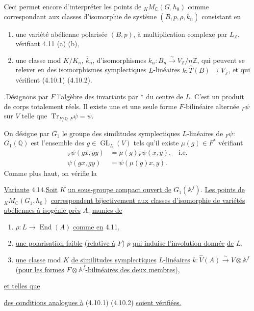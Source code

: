 \documentclass[10pt]{article}
\newcommand{\Af}{\mathbb A^f}
\newcommand{\C}{\mathbb C}
\newcommand{\Q}{\mathbb Q}
\newcommand{\Z}{\mathbb Z}
\newcommand{\GL}{\operatorname{GL}}
\newcommand{\End}{\operatorname{End}}
\newcommand{\Tr}{\operatorname{Tr}}
\begin{document}
Ceci permet encore d'interpréter les points de ${}_K M_{\C}(G,h_0)$ comme correspondant aux classes d'isomorphie de système $(B,p,\rho,\bar k_n)$ consistant en
\begin{enumerate}[label=(\alph*)]
\item une variété abélienne polarisée $(B,p)$, à multiplication complexe par $L_\Z$, vérifiant 4.11 (a) (b),
\item une classe mod $K/K_n$, $\bar k_n$, d'isomorphismes $k_n:B_n\xrightarrow{\sim}V_\Z/n\Z$, qui peuvent se relever en des isomorphismes symplectiques $L$-linéaires $k:\widehat T(B)\longrightarrow V_{\widehat{\Z}}$, et qui vérifient (4.10.1) (4.10.2).
\end{enumerate}

.\quad Désignons par $F$ l'algèbre des invariants par $*$ du centre de $L$. C'est un produit de corps totalement réels. Il existe une et une seule forme $F$-bilinéaire alternée ${}_F\psi$ sur $V$ telle que $\Tr_{F/\Q}{}_F\psi=\psi$.

On désigne par $G_1$ le groupe des similitudes symplectiques $L$-linéaires de ${}_F\psi$: $G_1(\Q)$ est l'ensemble des $g\in\GL_L(V)$ tels qu'il existe $\mu(g)\in F^*$ vérifiant
\begingroup
\makeatletter
\tagsleft@true
\makeatother
\begin{align}
{}_F\psi(gx,gy)&=\mu(g){}_F\psi(x,y),\quad\text{i.e.}\tag{4.13.1}\\
\psi(gx,gy)&=\psi(\mu(g)x,y).\tag{4.13.2}
\end{align}
\endgroup
Comme plus haut, on vérifie la

\noindent \uline{Variante} 4.14.\quad \uline{Soit} $K$ \uline{un sous-groupe compact ouvert de} $G_1(\Af)$. \uline{Les points de} ${}_K M_{\C}(G_1,h_0)$ \uline{correspondent bijectivement aux classes d'isomorphie de variétés} \uline{abéliennes à isogénie près} $A$, \uline{munies de}
\begin{enumerate}[label=(\alph*)]
\item $\rho:L\longrightarrow\End(A)$ \uline{comme en} 4.11,
\item \uline{une polarisation faible} \uline{(relative à} $F$) $\bar p$ \uline{qui induise l'involution donnée} \uline{de} $L$,
\item \uline{une classe} mod $K$ \uline{de similitudes symplectiques} \uline{$L$-linéaires} $k:\widehat V(A)\xrightarrow{\sim}V\otimes\Af$ (\uline{pour les formes} $F\otimes\Af$\uline{-bilinéaires des deux membres}),
\end{enumerate}
\uline{et telles que}
\begin{list}{}{\setlength{\leftmargin}{4em}\setlength{\labelwidth}{3em}\setlength{\labelsep}{1em}\setlength{\topsep}{.4em}\setlength{\itemsep}{0pt}}
\item[(*)] \uline{des conditions analogues à} (4.10.1) (4.10.2) \uline{soient vérifiées.}
\end{list}
\end{document}
